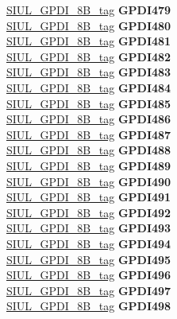 \begin{DoxyCompactItemize}
\begin{tabbing}
\>\>\mbox{\hyperlink{unionSIUL__GPDI__8B__tag}{SIUL\_GPDI\_8B\_tag}} {\bfseries GPDI479}\\
\>\>\mbox{\hyperlink{unionSIUL__GPDI__8B__tag}{SIUL\_GPDI\_8B\_tag}} {\bfseries GPDI480}\\
\>\>\mbox{\hyperlink{unionSIUL__GPDI__8B__tag}{SIUL\_GPDI\_8B\_tag}} {\bfseries GPDI481}\\
\>\>\mbox{\hyperlink{unionSIUL__GPDI__8B__tag}{SIUL\_GPDI\_8B\_tag}} {\bfseries GPDI482}\\
\>\>\mbox{\hyperlink{unionSIUL__GPDI__8B__tag}{SIUL\_GPDI\_8B\_tag}} {\bfseries GPDI483}\\
\>\>\mbox{\hyperlink{unionSIUL__GPDI__8B__tag}{SIUL\_GPDI\_8B\_tag}} {\bfseries GPDI484}\\
\>\>\mbox{\hyperlink{unionSIUL__GPDI__8B__tag}{SIUL\_GPDI\_8B\_tag}} {\bfseries GPDI485}\\
\>\>\mbox{\hyperlink{unionSIUL__GPDI__8B__tag}{SIUL\_GPDI\_8B\_tag}} {\bfseries GPDI486}\\
\>\>\mbox{\hyperlink{unionSIUL__GPDI__8B__tag}{SIUL\_GPDI\_8B\_tag}} {\bfseries GPDI487}\\
\>\>\mbox{\hyperlink{unionSIUL__GPDI__8B__tag}{SIUL\_GPDI\_8B\_tag}} {\bfseries GPDI488}\\
\>\>\mbox{\hyperlink{unionSIUL__GPDI__8B__tag}{SIUL\_GPDI\_8B\_tag}} {\bfseries GPDI489}\\
\>\>\mbox{\hyperlink{unionSIUL__GPDI__8B__tag}{SIUL\_GPDI\_8B\_tag}} {\bfseries GPDI490}\\
\>\>\mbox{\hyperlink{unionSIUL__GPDI__8B__tag}{SIUL\_GPDI\_8B\_tag}} {\bfseries GPDI491}\\
\>\>\mbox{\hyperlink{unionSIUL__GPDI__8B__tag}{SIUL\_GPDI\_8B\_tag}} {\bfseries GPDI492}\\
\>\>\mbox{\hyperlink{unionSIUL__GPDI__8B__tag}{SIUL\_GPDI\_8B\_tag}} {\bfseries GPDI493}\\
\>\>\mbox{\hyperlink{unionSIUL__GPDI__8B__tag}{SIUL\_GPDI\_8B\_tag}} {\bfseries GPDI494}\\
\>\>\mbox{\hyperlink{unionSIUL__GPDI__8B__tag}{SIUL\_GPDI\_8B\_tag}} {\bfseries GPDI495}\\
\>\>\mbox{\hyperlink{unionSIUL__GPDI__8B__tag}{SIUL\_GPDI\_8B\_tag}} {\bfseries GPDI496}\\
\>\>\mbox{\hyperlink{unionSIUL__GPDI__8B__tag}{SIUL\_GPDI\_8B\_tag}} {\bfseries GPDI497}\\
\>\>\mbox{\hyperlink{unionSIUL__GPDI__8B__tag}{SIUL\_GPDI\_8B\_tag}} {\bfseries GPDI498}\\

\end{tabbing}
\end{DoxyCompactItemize}

